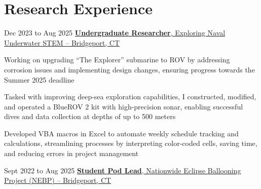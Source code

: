 \section{Research Experience}
    \begin{twocolentry}{
        Dec 2023 to Aug 2025
    }
        \href{https://nustem.bridgeport.edu/}{\textbf{Undergraduate Researcher}, Exploring Naval Underwater STEM -- Bridgeport, CT}
    \end{twocolentry}

    \vspace{0.10 cm}
    \begin{onecolentry}
        \begin{highlights}
            \item Working on upgrading “The Explorer” submarine to ROV by addressing corrosion issues and implementing design changes, ensuring progress towards the Summer 2025 deadline
            \item Tasked with improving deep-sea exploration capabilities, I constructed, modified, and operated a BlueROV 2 kit with high-precision sonar, enabling successful dives and data collection at depths of up to 500 meters
            \item Developed VBA macros in Excel to automate weekly schedule tracking and calculations, streamlining processes by interpreting color-coded cells, saving time, and reducing errors in project management
        \end{highlights}
    \end{onecolentry}

    \vspace{0.2 cm}

    \begin{twocolentry}{
        Sept 2022 to Aug 2025
    }
        \href{http://eclipse.montana.edu/}{\textbf{Student Pod Lead}, Nationwide Eclipse Ballooning Project (NEBP) -- Bridgeport, CT}
    \end{twocolentry}

